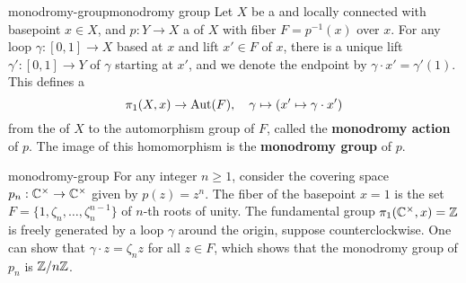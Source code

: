 \begin{topic}{monodromy-group}{monodromy group}
    Let $X$ be a  and locally connected  with basepoint $x \in X$, and $p : Y \to X$ a  of $X$ with fiber $F = p^{-1}(x)$ over $x$. For any loop $\gamma : [0, 1] \to X$ based at $x$ and lift $x' \in F$ of $x$, there is a unique lift $\gamma' : [0, 1] \to Y$ of $\gamma$ starting at $x'$, and we denote the endpoint by $\gamma \cdot x' = \gamma'(1)$. This defines a 
    \[ \pi_1(X, x) \to \textup{Aut}(F), \quad \gamma \mapsto (x' \mapsto \gamma \cdot x') \]
    from the  of $X$ to the automorphism group of $F$, called the \textbf{monodromy action} of $p$. The image of this homomorphism is the \textbf{monodromy group} of $p$.
\end{topic}

\begin{example}{monodromy-group}
    For any integer $n \ge 1$, consider the covering space $p_n : \mathbb{C}^\times \to \mathbb{C}^\times$ given by $p(z) = z^n$. The fiber of the basepoint $x = 1$ is the set $F = \{ 1, \zeta_n, \ldots, \zeta_n^{n - 1} \}$ of $n$-th roots of unity. The fundamental group $\pi_1(\mathbb{C}^\times, x) = \mathbb{Z}$ is freely generated by a loop $\gamma$ around the origin, suppose counterclockwise. One can show that $\gamma \cdot z = \zeta_n z$ for all $z \in F$, which shows that the monodromy group of $p_n$ is $\mathbb{Z}/n\mathbb{Z}$.
\end{example}
